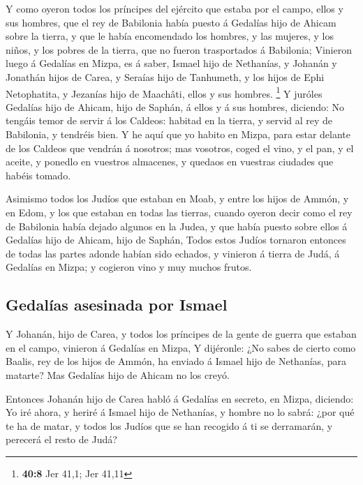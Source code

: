  Y como oyeron todos los príncipes del ejército que estaba
por el campo, ellos y sus hombres, que el rey de Babilonia había puesto
á Gedalías hijo de Ahicam sobre la tierra, y que le había encomendado
los hombres, y las mujeres, y los niños, y los pobres de la tierra, que
no fueron trasportados á Babilonia;  Vinieron luego á
Gedalías en Mizpa, es á saber, Ismael hijo de Nethanías, y Johanán y
Jonathán hijos de Carea, y Seraías hijo de Tanhumeth, y los hijos de
Ephi Netophatita, y Jezanías hijo de Maachâti, ellos y sus hombres.
\footnote{\textbf{40:8} Jer 41,1; Jer 41,11}  Y juróles
Gedalías hijo de Ahicam, hijo de Saphán, á ellos y á sus hombres,
diciendo: No tengáis temor de servir á los Caldeos: habitad en la
tierra, y servid al rey de Babilonia, y tendréis bien.  Y
he aquí que yo habito en Mizpa, para estar delante de los Caldeos que
vendrán á nosotros; mas vosotros, coged el vino, y el pan, y el aceite,
y ponedlo en vuestros almacenes, y quedaos en vuestras ciudades que
habéis tomado.

 Asimismo todos los Judíos que estaban en Moab, y entre
los hijos de Ammón, y en Edom, y los que estaban en todas las tierras,
cuando oyeron decir como el rey de Babilonia había dejado algunos en la
Judea, y que había puesto sobre ellos á Gedalías hijo de Ahicam, hijo de
Saphán,  Todos estos Judíos tornaron entonces de todas
las partes adonde habían sido echados, y vinieron á tierra de Judá, á
Gedalías en Mizpa; y cogieron vino y muy muchos frutos.

\hypertarget{gedaluxedas-asesinada-por-ismael}{%
\subsection{Gedalías asesinada por
Ismael}\label{gedaluxedas-asesinada-por-ismael}}

 Y Johanán, hijo de Carea, y todos los príncipes de la
gente de guerra que estaban en el campo, vinieron á Gedalías en Mizpa,
 Y dijéronle: ¿No sabes de cierto como Baalis, rey de los
hijos de Ammón, ha enviado á Ismael hijo de Nethanías, para matarte? Mas
Gedalías hijo de Ahicam no los creyó.

 Entonces Johanán hijo de Carea habló á Gedalías en
secreto, en Mizpa, diciendo: Yo iré ahora, y heriré á Ismael hijo de
Nethanías, y hombre no lo sabrá: ¿por qué te ha de matar, y todos los
Judíos que se han recogido á ti se derramarán, y perecerá el resto de
Judá?

